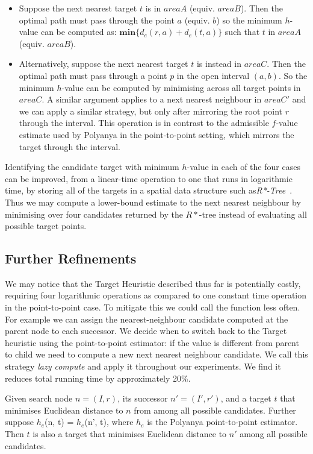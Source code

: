 \begin{itemize}
  \item Suppose the next nearest target $t$ is in $areaA$ (equiv. $areaB$). Then the optimal path must pass through the point $a$ (equiv. $b$) so the minimum $h$-value can be computed as: $\mathbf{min}\{d_e(r, a) + d_e(t, a)\}$ such that $t$ in $areaA$ (equiv. $areaB$).
  \item Alternatively, suppose the next nearest target $t$ is instead in $areaC$. Then the optimal path must pass through a point $p$ in the open  interval $(a, b)$. So the minimum $h$-value can be computed by minimising across all target points in $areaC$. A similar argument applies to a next nearest neighbour in $areaC'$ and we can apply a similar strategy, but only after mirroring the root point $r$ through the interval. This operation is in contrast to the admissible $f$-value estimate used by Polyanya in the point-to-point setting, which mirrors the target through the interval.
\end{itemize}

\noindent
Identifying the candidate target with minimum $h$-value in each of the four cases can be improved,
from a linear-time operation to one that runs in logarithmic time, by storing all of the targets in a spatial data structure such as\textit{R*-Tree}~\cite{beckmann1990r}. Thus we may compute a lower-bound
estimate to the next nearest neighbour by minimising over four candidates returned by the $R*$-tree instead of evaluating all possible target points.

\subsection{Further Refinements}
We may notice that the Target Heuristic described thus far is potentially costly, requiring 
four logarithmic operations as compared to one constant time operation in the point-to-point case.
To mitigate this we could call the function less often. For example we can assign the nearest-neighbour candidate computed at the parent node to each successor. We decide when to switch back to the Target heuristic using the point-to-point estimator: if the value is different from parent to child we need
to compute a new next nearest neighbour candidate. We call this strategy \textit{lazy compute}
and apply it throughout our experiments. We find it reduces total running time by approximately
20\%.

\begin{lemma}\label{lazy-compute}
  Given search node $n=(I,r)$, its successor $n'=(I', r')$, and a target $t$ that minimises Euclidean distance to $n$ from among all possible candidates. Further suppose $h_e$(n, t) = $h_e$(n', t), where $h_e$ is the Polyanya point-to-point estimator. Then $t$ is also a target that minimises Euclidean distance to $n'$ among all possible candidates.
\end{lemma}

